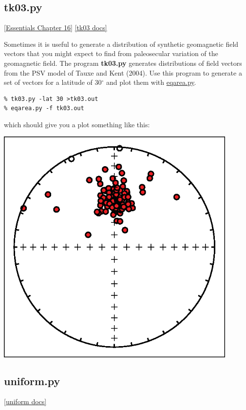 \documentclass[11pt]{book}
\begin{document}
{

\subsection{tk03.py}
\href{http://earthref.org/MAGIC/books/Tauxe/Essentials/WebBook3ch16.html/#ch16}{[Essentials Chapter 16]}
\href{https://github.com/PmagPy/PmagPy/blob/master/programs/tk03.py}{[tk03 docs]}

Sometimes it is useful to generate a distribution of synthetic geomagnetic field vectors that you might expect to find from paleosecular variation of the geomagnetic field.  The program {\bf tk03.py} generates distributions of field vectors from the PSV model of Tauxe and Kent (2004).  \nocite{tauxe04}    Use this program to generate a set of vectors  for a latitude of 30$^{\circ}$ and plot them with \href{#eqarea.py}{eqarea.py}.

\begin{verbatim}
% tk03.py -lat 30 >tk03.out
% eqarea.py -f tk03.out
\end{verbatim}

which should give you a plot something like this:

\includegraphics[width=12cm]{EPSfiles/tk03.eps}


\subsection{uniform.py}
\href{https://github.com/PmagPy/PmagPy/blob/master/programs/uniform.py}{[uniform docs]}

}
\end{document}
